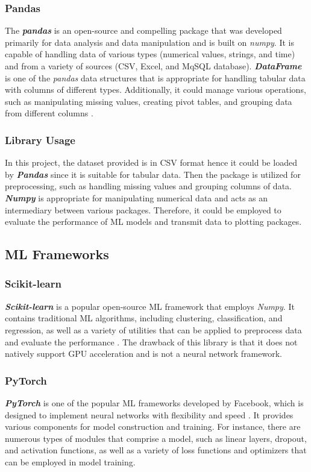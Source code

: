\documentclass[12pt,twoside]{report}
\begin{document}
\subsubsection{Pandas}
The \textbf{\textit{pandas}} is an open-source and compelling package that was developed primarily for data analysis and data manipulation and is built on \textit{numpy}. It is capable of handling data of various types (numerical values, strings, and time) and from a variety of sources (CSV, Excel, and MqSQL database). \textbf{\textit{DataFrame}} is one of the \textit{pandas} data structures that is appropriate for handling tabular data with columns of different types. Additionally, it could manage various operations, such as manipulating missing values, creating pivot tables, and grouping data from different columns \citep{RN4}. 

\subsubsection{Library Usage}
In this project, the dataset provided is in CSV format hence it could be loaded by \textbf{\textit{Pandas}} since it is suitable for tabular data. Then the package is utilized for preprocessing, such as handling missing values and grouping columns of data. 
\\

\textit{\textbf{Numpy}} is appropriate for manipulating numerical data and acts as an intermediary between various packages. Therefore, it could be employed to evaluate the performance of ML models and transmit data to plotting packages. 


\subsection{ML Frameworks}
\subsubsection{Scikit-learn}
\textit{\textbf{Scikit-learn}} is a popular open-source ML framework that employs \textit{Numpy}. It contains traditional ML algorithms, including clustering, classification, and regression, as well as a variety of utilities that can be applied to preprocess data and evaluate the performance \citep{RN7}. The drawback of this library is that it does not natively support GPU acceleration and is not a neural network framework. 

\subsubsection{PyTorch}
\textbf{\textit{PyTorch}} is one of the popular ML frameworks developed by Facebook, which is designed to implement neural networks with flexibility and speed \citep{RN5}. It provides various components for model construction and training. For instance, there are numerous types of modules that comprise a model, such as linear layers, dropout, and activation functions, as well as a variety of loss functions and optimizers that can be employed in model training. 
\\
\end{document}
